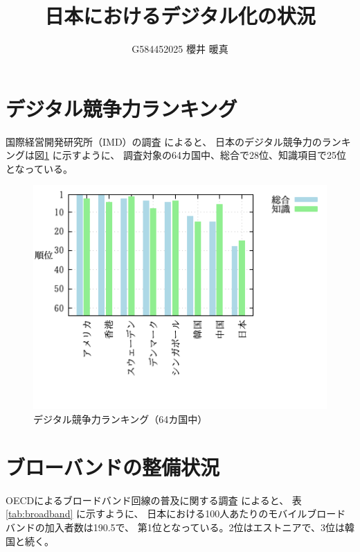 \documentclass[a4paper,11pt,dvipdfmx]{ujarticle}
\title{日本におけるデジタル化の状況}
\author{G584452025 櫻井 暖真}
\begin{document}
\maketitle %

\section{デジタル競争力ランキング}


国際経営開発研究所（IMD）の調査 \cite{imd} によると、
日本のデジタル競争力のランキングは図\ref{fig:ranking} に示すように、
調査対象の64カ国中、総合で28位、知識項目で25位となっている。

\begin{figure}[htbp]
    \centering
    \includegraphics[width=1\textwidth]{fig31.png} %
    \caption{デジタル競争力ランキング（64カ国中）}
    \label{fig:ranking}
\end{figure}

\section{ブローバンドの整備状況}
OECDによるブロードバンド回線の普及に関する調査 \cite{oecd} によると、
表\ref{tab:broadband} に示すように、
日本における100人あたりのモバイルブロードバンドの加入者数は190.5で、
第1位となっている。2位はエストニアで、3位は韓国と続く。
\end{document}
